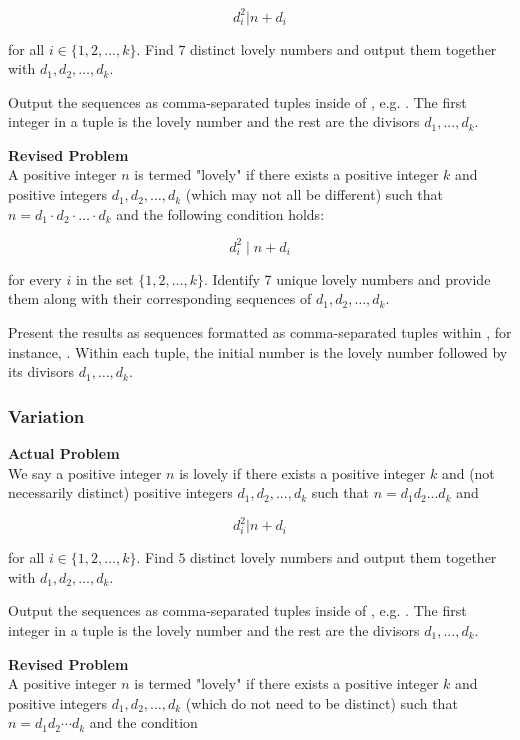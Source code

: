 $$d_i^2 | n + d_i$$

for all $i \in \{1, 2, ..., k\}$. Find $7$ distinct lovely numbers and output them together with $d_1, d_2, \ldots, d_k$.

Output the sequences as comma-separated tuples inside of \boxed, e.g. . The first integer in a tuple is the lovely number and the rest are the divisors $d_1, ..., d_k$.

\textbf{Revised Problem}\\
A positive integer \( n \) is termed "lovely" if there exists a positive integer \( k \) and positive integers \( d_1, d_2, \ldots, d_k \) (which may not all be different) such that \( n = d_1 \cdot d_2 \cdot \ldots \cdot d_k \) and the following condition holds:

$$d_i^2 \mid n + d_i$$

for every \( i \) in the set \(\{1, 2, \ldots, k\}\). Identify 7 unique lovely numbers and provide them along with their corresponding sequences of \( d_1, d_2, \ldots, d_k \).

Present the results as sequences formatted as comma-separated tuples within \boxed, for instance, . Within each tuple, the initial number is the lovely number followed by its divisors \( d_1, \ldots, d_k \).

\subsubsection{Variation}
\textbf{Actual Problem}\\
We say a positive integer $n$ is lovely if there exists a positive integer $k$ and (not necessarily distinct) positive integers $d_1, d_2, ..., d_k$ such that $n = d_1 d_2 ... d_k$ and

$$d_i^2 | n + d_i$$

for all $i \in \{1, 2, ..., k\}$. Find $5$ distinct lovely numbers and output them together with $d_1, d_2, \ldots, d_k$.

Output the sequences as comma-separated tuples inside of \boxed, e.g. . The first integer in a tuple is the lovely number and the rest are the divisors $d_1, ..., d_k$.

\textbf{Revised Problem}\\
A positive integer \( n \) is termed "lovely" if there exists a positive integer \( k \) and positive integers \( d_1, d_2, \ldots, d_k \) (which do not need to be distinct) such that \( n = d_1 d_2 \cdots d_k \) and the condition

